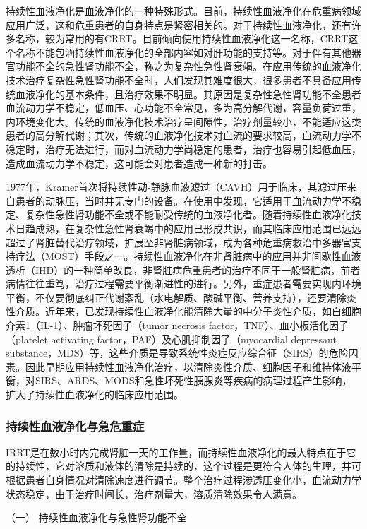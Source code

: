 持续性血液净化是血液净化的一种特殊形式。目前，持续性血液净化在危重病领域应用广泛，这和危重患者的自身特点是紧密相关的。对于持续性血液净化，还有许多名称，较为常用的有CRRT。目前倾向使用持续性血液净化这一名称，CRRT这个名称不能包涵持续性血液净化的全部内容如对肝功能的支持等。对于伴有其他器官功能不全的急性肾功能不全，称之为复杂性急性肾衰竭。在应用传统的血液净化技术治疗复杂性急性肾功能不全时，人们发现其难度很大，很多患者不具备应用传统血液净化的基本条件，且治疗效果不明显。其原因是复杂性急性肾功能不全患者血流动力学不稳定，低血压、心功能不全常见，多为高分解代谢，容量负荷过重，内环境变化大。传统的血液净化技术治疗呈间隙性，治疗剂量较小，不能适应这类患者的高分解代谢；其次，传统的血液净化技术对血流的要求较高，血流动力学不稳定时，治疗无法进行，而对血流动力学尚稳定的患者，治疗也容易引起低血压，造成血流动力学不稳定，这可能会对患者造成一种新的打击。

1977年，Kramer首次将持续性动-静脉血液滤过（CAVH）用于临床，其滤过压来自患者的动脉压，当时并无专门的设备。在使用中发现，它适用于血流动力学不稳定、复杂性急性肾功能不全或不能耐受传统的血液净化者。随着持续性血液净化技术日趋成熟，在复杂性急性肾衰竭中的应用已形成共识，而其临床应用范围已远远超过了肾脏替代治疗领域，扩展至非肾脏病领域，成为各种危重病救治中多器官支持疗法（MOST）手段之一。持续性血液净化在非肾脏病中的应用并非间歇性血液透析（IHD）的一种简单改良，非肾脏病危重患者的治疗不同于一般肾脏病，前者病情往往重笃，治疗过程需要平衡渐进性的进行。另外，重症患者需要实现内环境平衡，不仅要彻底纠正代谢紊乱（水电解质、酸碱平衡、营养支持），还要清除炎性介质。近年来，已发现持续性血液净化能清除大量的中分子炎性介质，如白细胞介素1（IL-1）、肿瘤坏死因子（tumor
necrosis factor，TNF）、血小板活化因子（platelet activating
factor，PAF）及心肌抑制因子（myocardial depressant
substance，MDS）等，这些介质是导致系统性炎症反应综合征（SIRS）的危险因素。因此早期应用持续性血液净化治疗，以清除炎性介质、细胞因子和维持体液平衡，对SIRS、ARDS、MODS和急性坏死性胰腺炎等疾病的病理过程产生影响，扩大了持续性血液净化的临床应用范围。

\subsubsection{持续性血液净化与急危重症}

IRRT是在数小时内完成肾脏一天的工作量，而持续性血液净化的最大特点在于它的持续性，它对溶质和液体的清除是持续的，这个过程是更符合人体的生理，并可根据患者自身情况对清除速度进行调节。整个治疗过程渗透压变化小，血流动力学状态稳定，由于治疗时间长，治疗剂量大，溶质清除效果令人满意。

\hypertarget{text00391.htmlux5cux23CHP16-10-2-2-1}{}
（一） 持续性血液净化与急性肾功能不全

